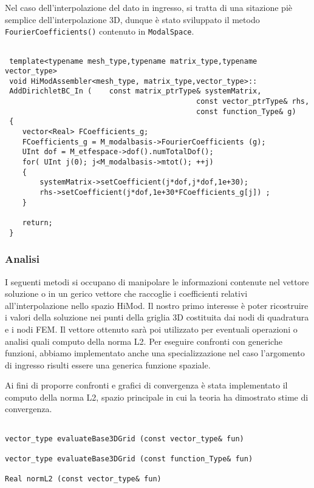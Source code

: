 Nel caso dell'interpolazione del dato in ingresso, si tratta di una sitazione pi\`e semplice dell'interpolazione 3D, dunque \`e stato sviluppato 
il metodo \texttt{FourierCoefficients()} contenuto in \texttt{ModalSpace}.
\begin{lstlisting}[style = general]

 template<typename mesh_type,typename matrix_type,typename vector_type>
 void HiModAssembler<mesh_type, matrix_type,vector_type>::
 AddDirichletBC_In (	const matrix_ptrType& systemMatrix,
 											const vector_ptrType& rhs,
 											const function_Type& g)
 {
 	vector<Real> FCoefficients_g;
 	FCoefficients_g = M_modalbasis->FourierCoefficients (g);
 	UInt dof = M_etfespace->dof().numTotalDof();
 	for( UInt j(0); j<M_modalbasis->mtot(); ++j)
 	{
		systemMatrix->setCoefficient(j*dof,j*dof,1e+30);
		rhs->setCoefficient(j*dof,1e+30*FCoefficients_g[j]) ;
 	}
 	
 	return;
 }
\end{lstlisting}

\subsubsection{Analisi}

I seguenti metodi si occupano di manipolare le informazioni contenute nel vettore soluzione o in un gerico vettore che raccoglie i coefficienti 
relativi all'interpolazione nello spazio HiMod. Il nostro primo interesse \`e poter ricostruire i valori della soluzione nei punti della griglia 
3D costituita dai nodi di quadratura e i nodi FEM. Il vettore ottenuto sar\`a poi utilizzato per eventuali operazioni o analisi quali computo 
della norma L2.
Per eseguire confronti con generiche funzioni, abbiamo implementato anche una specializzazione nel caso l'argomento di ingresso risulti essere 
una generica funzione spaziale.

Ai fini di proporre confronti e grafici di convergenza \`e stata implementato il computo della norma L2, spazio principale in cui la teoria ha 
dimostrato stime di convergenza.

\begin{lstlisting}[style = general,frame=none]

vector_type evaluateBase3DGrid (const vector_type& fun)

vector_type evaluateBase3DGrid (const function_Type& fun)

Real normL2 (const vector_type& fun)

\end{lstlisting}

